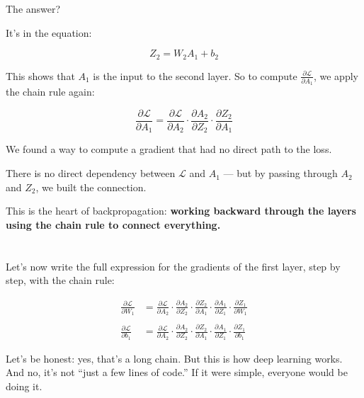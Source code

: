 \documentclass[11pt]{article}
\begin{document}
The answer?

It’s in the equation:

\[
Z_2 = W_2 A_1 + b_2
\]

This shows that $A_1$ is the input to the second layer.  
So to compute $\frac{\partial \mathcal{L}}{\partial A_1}$, we apply the chain rule again:

\[
\frac{\partial \mathcal{L}}{\partial A_1} = 
\frac{\partial \mathcal{L}}{\partial A_2} \cdot 
\frac{\partial A_2}{\partial Z_2} \cdot 
\frac{\partial Z_2}{\partial A_1}
\]

\vspace{1em}

\begin{tcolorbox}[colback=green!5!white, colframe=green!60!black, title=What Just Happened]
We found a way to compute a gradient that had no direct path to the loss.

There is no direct dependency between $\mathcal{L}$ and $A_1$ —  
but by passing through $A_2$ and $Z_2$, we built the connection.

This is the heart of backpropagation:  
\textbf{working backward through the layers using the chain rule to connect everything.}
\end{tcolorbox}


\section*{}

Let’s now write the full expression for the gradients of the first layer, step by step, with the chain rule:

\[
\begin{aligned}
\frac{\partial \mathcal{L}}{\partial W_1} &= 
\frac{\partial \mathcal{L}}{\partial A_2} \cdot 
\frac{\partial A_2}{\partial Z_2} \cdot 
\frac{\partial Z_2}{\partial A_1} \cdot 
\frac{\partial A_1}{\partial Z_1} \cdot 
\frac{\partial Z_1}{\partial W_1} \\
\\
\frac{\partial \mathcal{L}}{\partial b_1} &= 
\frac{\partial \mathcal{L}}{\partial A_2} \cdot 
\frac{\partial A_2}{\partial Z_2} \cdot 
\frac{\partial Z_2}{\partial A_1} \cdot 
\frac{\partial A_1}{\partial Z_1} \cdot 
\frac{\partial Z_1}{\partial b_1}
\end{aligned}
\]

Let’s be honest: yes, that’s a long chain.  
But this is how deep learning works. And no, it’s not “just a few lines of code.”  
If it were simple, everyone would be doing it.
\end{document}

